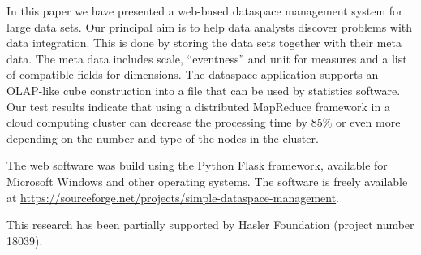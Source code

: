 \documentclass[USenglish,twocolumn]{article}
\begin{document}
In this paper we have presented a web-based dataspace management system
for large data sets. Our principal aim is to help data analysts discover
problems with data integration. This is done by storing the data sets
together with their meta data. The meta data includes scale,
``eventness'' and unit for measures and a list of compatible fields for
dimensions. The dataspace application supports an OLAP-like cube
construction into a file that can be used by statistics software. Our
test results indicate that using a distributed MapReduce framework in a
cloud computing cluster can decrease the processing time by 85\% or even
more depending on the number and type of the nodes in the cluster.

The web software was build using the Python Flask framework, available
for Microsoft Windows and other operating systems. The software is
freely available at
\url{https://sourceforge.net/projects/simple-dataspace-management}.

This research has been partially supported by Hasler Foundation (project
number 18039).



\end{document}
